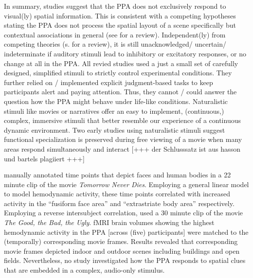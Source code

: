 \documentclass[english]{article}
\begin{document}
In summary, studies suggest that the PPA does not exclusively respond to visual(ly) spatial information.
This is consistent with a competing hypotheses stating the PPA does not process the spatial layout of a scene specifically but contextual associations in general (see \citep{aminoff2006parahippocampal} for a review).
Independent(ly) from competing theories (s. \citep{aminoff2013role} for a review), it is still unacknowledged/ uncertain/ indeterminate if auditory stimuli lead to inhibitory or excitatory responses, or no change at all in the PPA.
All revied studies used a just a small set of carefully designed, simplified stimuli to strictly control experimental conditions.
They further relied on / implemented explicit judgment-based tasks to keep participants alert and paying attention.
Thus, they cannot / could answer the question how the PPA might behave under life-like conditions.
Naturalistic stimuli like movies \citep{hasson2008neurocinematics, sonkusare2019naturalistic} or narratives \citep{honey2012not, lerner2011topographic, silbert2014coupled} offer an easy to implement, (continuous,) complex, immersive stimuli that better resemble our experience of a continuous dynamic environment.
Two early studies using naturalistic stimuli suggest functional specialization is preserved during free viewing of a movie when many areas respond simultaneously and interact [+++ der Schlusssatz ist aus hasson und bartels plagiiert \citep{bartels2004mapping, hasson2004intersubject}+++]

\citep{bartels2004mapping} manually annotated time points that depict faces and human bodies in a 22 minute clip of the movie \textit{Tomorrow Never Dies}.
Employing a general linear model to model hemodynamic activity, these time points correlated with increased activity in the ``fusiform face area'' \citep{kanwisher1997ffa} and ``extrastriate body area'' \citep{downing2001bodyarea} respectively.
Employing a reverse intersubject correlation, \citep{hasson2004intersubject} used a 30 minute clip of the movie \textit{The Good, the Bad, the Ugly}.
fMRI brain volumes showing the highest hemodynamic activity in the PPA [across (five) participants] were matched to the (temporally) corresponding movie frames.
Results revealed that corresponding movie frames depicted indoor and outdoor scenes including buildings and open fields.
Nevertheless, no study investigated how the PPA responds to spatial clues that are embedded in a complex, audio-only stimulus.
\end{document}
